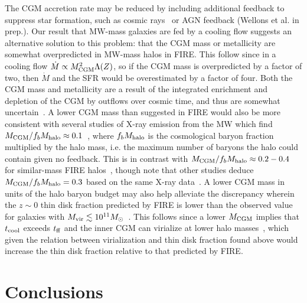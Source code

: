 \documentclass[fleqn,usenatbib]{mnras}
\newcommand{\Mdot}{\dot{M}}
\begin{document}
The CGM accretion rate may be reduced by including additional feedback to suppress star formation, such as cosmic rays~\citep{Chan2019, Hopkins2020, Hopkins2020a, Hopkins2020b}
or AGN feedback (Wellons et al. in prep.). 
Our result that MW-mass galaxies are fed by a cooling flow suggests an alternative solution to this problem: that the CGM mass or metallicity are somewhat overpredicted in MW-mass halos in FIRE.
This follow since in a cooling flow $\Mdot\propto M_{\rm CGM}^2 \Lambda(Z)$, so if the CGM mass is overpredicted by a factor of two, then $\Mdot$ and the SFR would be overestimated by a factor of four.
Both the CGM mass and metallicity are a result of the integrated enrichment and depletion of the CGM by outflows over cosmic time, and thus are somewhat uncertain~\citep{Kelly2021}.
A lower CGM mass than suggested in FIRE would also be more consistent with several studies of X-ray emission from the MW which find $M_{\rm CGM}/f_bM_{\rm halo} \approx 0.1$~\citep[][]{Faerman2017, Li2018, Bregman2018}, where $f_b M_{\rm halo}$ is the cosmological baryon fraction multiplied by the halo mass, i.e. the maximum number of baryons the halo could contain given no feedback.
This is in contrast with $M_{\rm CGM}/f_bM_{\rm halo} \approx 0.2-0.4$ for similar-mass FIRE halos~\citep{Hafen2019}, though note that other studies deduce $M_{\rm CGM}/f_bM_{\rm halo}=0.3$ based on the same X-ray data~\citep{Faerman2019}.
A lower CGM mass in units of the halo baryon budget may also help alleviate the discrepancy wherein the $z\sim0$ thin disk fraction predicted by FIRE is lower than the observed value for galaxies with $M_{\rm vir} \lesssim 10^{11} M_\odot$~\citep{El-Badry2018, Peebles2020, Stern2020}.
This follows since a lower $M_{\rm CGM}$ implies that $t_{\rm cool}$ exceeds $t_{\rm ff}$ and the inner CGM can virialize at lower halo masses~\citep{Stern2020}, which given the relation between virialization and thin disk fraction found above would increase the thin disk fraction relative to that predicted by FIRE. 

\section{Conclusions}
\label{s: conclusions}
\end{document}
